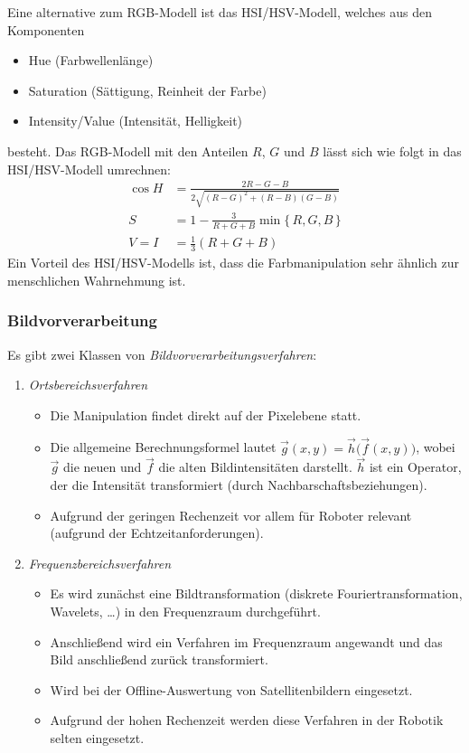 				Eine alternative zum RGB-Modell ist das HSI/HSV-Modell, welches aus den Komponenten
				\begin{itemize}
					\item Hue (Farbwellenlänge)
					\item Saturation (Sättigung, Reinheit der Farbe)
					\item Intensity/Value (Intensität, Helligkeit)
				\end{itemize}
				besteht. Das RGB-Modell mit den Anteilen \(R\), \(G\) und \(B\) lässt sich wie folgt in das HSI/HSV-Modell umrechnen:
				\begin{align*}
					\cos H & = \frac{2R - G - B}{2\sqrt{(R - G)^2 + (R - B)(G - B)}} \\
					S      & = 1 - \frac{3}{R + G + B} \min \{\, R, G, B \,\}        \\
					V = I  & = \frac{1}{3} (R + G + B)
				\end{align*}
				Ein Vorteil des HSI/HSV-Modells ist, dass die Farbmanipulation sehr ähnlich zur menschlichen Wahrnehmung ist.

			\subsubsection{Bildvorverarbeitung}
				Es gibt zwei Klassen von \emph{Bildvorverarbeitungsverfahren}:
				\begin{enumerate}
					\item \emph{Ortsbereichsverfahren}
						\begin{itemize}
							\item Die Manipulation findet direkt auf der Pixelebene statt.
							\item Die allgemeine Berechnungsformel lautet \( \vec{g}(x, y) = \vec{h}\big(\vec{f}(x, y)\big) \), wobei \(\vec{g}\) die neuen und \(\vec{f}\) die alten Bildintensitäten darstellt. \(\vec{h}\) ist ein Operator, der die Intensität transformiert (\bspw durch Nachbarschaftsbeziehungen).
							\item Aufgrund der geringen Rechenzeit vor allem für Roboter relevant (aufgrund der Echtzeitanforderungen).
						\end{itemize}
					\item \emph{Frequenzbereichsverfahren}
						\begin{itemize}
							\item Es wird zunächst eine Bildtransformation (diskrete Fouriertransformation, Wavelets, \dots) in den Frequenzraum durchgeführt.
							\item Anschließend wird ein Verfahren im Frequenzraum angewandt und das Bild anschließend zurück transformiert.
							\item Wird \bspw bei der Offline-Auswertung von Satellitenbildern eingesetzt.
							\item Aufgrund der hohen Rechenzeit werden diese Verfahren in der Robotik selten eingesetzt.
						\end{itemize}
				\end{enumerate}

